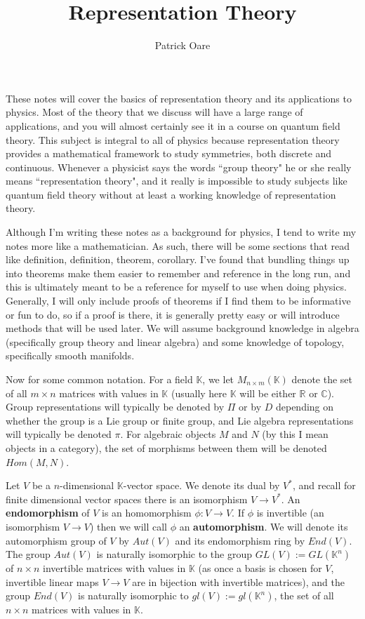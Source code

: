 \documentclass[11pt, oneside]{article}   	%
\title{Representation Theory}
\author{Patrick Oare}
\date{}							%
\theoremstyle{definition}
\begin{document}
\maketitle

These notes will cover the basics of representation theory and its applications to physics. Most of the 
theory that we discuss will have a large range of applications, and you will almost certainly see it in 
a course on quantum field theory. This subject is integral to all of physics because representation 
theory provides a mathematical framework to study symmetries, both discrete and continuous. 
Whenever a physicist says the words ``group theory" he or she really means ``representation theory", and 
it really is impossible to study subjects like quantum field theory without at least a working knowledge 
of representation theory. 

Although I'm writing these notes as a background for physics, I tend to write my notes more like a 
mathematician. As such, there will be some sections that read like definition, definition, theorem, 
corollary. I've found that bundling things up into theorems make them easier to remember and reference 
in the long run, and this is ultimately meant to be a reference for myself to use when doing physics. 
Generally, I will only include proofs of theorems if I find them to be informative or fun to do, so if a 
proof is there, it is generally pretty easy or will introduce methods that will be used later. We will 
assume background knowledge in algebra (specifically group theory and linear algebra) and some 
knowledge of topology, specifically smooth manifolds. 

Now for some common notation. For a field $\mathbb K$, we let  $M_{n\times m}(\mathbb K)$ 
denote the set of all $m\times n$ matrices with values in $\mathbb K$ (usually here $\mathbb K$ will 
be either $\mathbb R$ or $\mathbb C$). Group representations will typically be denoted by $\Pi$ or 
by $D$ depending on whether the group is a Lie group or finite group, and Lie algebra representations 
will typically be denoted $\pi$. For algebraic objects $M$ and $N$ (by this I mean objects in a category), 
the set of morphisms between them will be denoted $Hom(M, N)$.

Let $V$ be a $n$-dimensional $\mathbb K$-vector space. We denote its dual by $V^*$, and recall for 
finite dimensional vector spaces there is an isomorphism $V\rightarrow V^*$. An \textbf{endomorphism} 
of $V$ is an homomorphism $\phi : V\rightarrow V$. If $\phi$ is invertible (an isomorphism $V\rightarrow 
V$) then we will call $\phi$ an \textbf{automorphism}. We will denote its automorphism group of $V$ by $Aut(V)$ 
and its endomorphism ring by $End(V)$. The group $Aut(V)$ is naturally isomorphic to the group 
$GL(V) := GL(\mathbb K^n)$ of $n\times n$ invertible matrices with values in $\mathbb K$ (as once 
a basis is chosen for $V$, invertible linear maps $V\rightarrow V$ are in bijection with invertible matrices), 
and the group $End(V)$ is naturally isomorphic to $gl(V) := gl(\mathbb K^n)$, the set of all $n\times n$ 
matrices with values in $\mathbb K$. 
\end{document}
